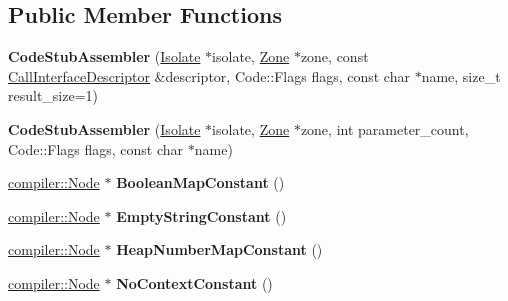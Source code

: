 \subsection*{Public Member Functions}
\begin{DoxyCompactItemize}
\item 
{\bfseries Code\+Stub\+Assembler} (\hyperlink{classv8_1_1internal_1_1_isolate}{Isolate} $\ast$isolate, \hyperlink{classv8_1_1internal_1_1_zone}{Zone} $\ast$zone, const \hyperlink{classv8_1_1internal_1_1_call_interface_descriptor}{Call\+Interface\+Descriptor} \&descriptor, Code\+::\+Flags flags, const char $\ast$name, size\+\_\+t result\+\_\+size=1)\hypertarget{classv8_1_1internal_1_1_code_stub_assembler_a366bedba796c0ce602caf7d4536510a2}{}\label{classv8_1_1internal_1_1_code_stub_assembler_a366bedba796c0ce602caf7d4536510a2}

\item 
{\bfseries Code\+Stub\+Assembler} (\hyperlink{classv8_1_1internal_1_1_isolate}{Isolate} $\ast$isolate, \hyperlink{classv8_1_1internal_1_1_zone}{Zone} $\ast$zone, int parameter\+\_\+count, Code\+::\+Flags flags, const char $\ast$name)\hypertarget{classv8_1_1internal_1_1_code_stub_assembler_abedcb5d8bc010a04f1fcd9ade0f2f6db}{}\label{classv8_1_1internal_1_1_code_stub_assembler_abedcb5d8bc010a04f1fcd9ade0f2f6db}

\item 
\hyperlink{classv8_1_1internal_1_1compiler_1_1_node}{compiler\+::\+Node} $\ast$ {\bfseries Boolean\+Map\+Constant} ()\hypertarget{classv8_1_1internal_1_1_code_stub_assembler_a5da89ffcb811d578b09bc7e430c31f23}{}\label{classv8_1_1internal_1_1_code_stub_assembler_a5da89ffcb811d578b09bc7e430c31f23}

\item 
\hyperlink{classv8_1_1internal_1_1compiler_1_1_node}{compiler\+::\+Node} $\ast$ {\bfseries Empty\+String\+Constant} ()\hypertarget{classv8_1_1internal_1_1_code_stub_assembler_a4d87f47f6e4de2835a6a2ca189293cc4}{}\label{classv8_1_1internal_1_1_code_stub_assembler_a4d87f47f6e4de2835a6a2ca189293cc4}

\item 
\hyperlink{classv8_1_1internal_1_1compiler_1_1_node}{compiler\+::\+Node} $\ast$ {\bfseries Heap\+Number\+Map\+Constant} ()\hypertarget{classv8_1_1internal_1_1_code_stub_assembler_a5afb5a06e4426523167bcb1dff994337}{}\label{classv8_1_1internal_1_1_code_stub_assembler_a5afb5a06e4426523167bcb1dff994337}

\item 
\hyperlink{classv8_1_1internal_1_1compiler_1_1_node}{compiler\+::\+Node} $\ast$ {\bfseries No\+Context\+Constant} ()\hypertarget{classv8_1_1internal_1_1_code_stub_assembler_a2daf6550e340ff7c710a718d60ec7282}{}\label{classv8_1_1internal_1_1_code_stub_assembler_a2daf6550e340ff7c710a718d60ec7282}


\end{DoxyCompactItemize}
